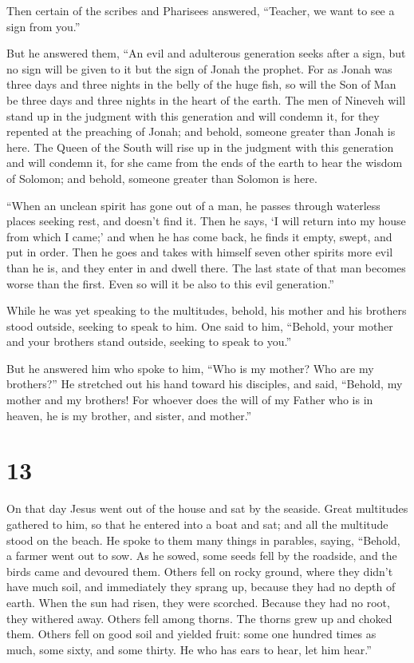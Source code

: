  Then certain of the scribes and Pharisees answered,
``Teacher, we want to see a sign from you.''

 But he answered them, ``An evil and adulterous generation
seeks after a sign, but no sign will be given to it but the sign of
Jonah the prophet.  For as Jonah was three days and three
nights in the belly of the huge fish, so will the Son of Man be three
days and three nights in the heart of the earth.  The men
of Nineveh will stand up in the judgment with this generation and will
condemn it, for they repented at the preaching of Jonah; and behold,
someone greater than Jonah is here.  The Queen of the South
will rise up in the judgment with this generation and will condemn it,
for she came from the ends of the earth to hear the wisdom of Solomon;
and behold, someone greater than Solomon is here.

 ``When an unclean spirit has gone out of a man, he passes
through waterless places seeking rest, and doesn't find it.
 Then he says, `I will return into my house from which I
came;' and when he has come back, he finds it empty, swept, and put in
order.  Then he goes and takes with himself seven other
spirits more evil than he is, and they enter in and dwell there. The
last state of that man becomes worse than the first. Even so will it be
also to this evil generation.''

 While he was yet speaking to the multitudes, behold, his
mother and his brothers stood outside, seeking to speak to him.
 One said to him, ``Behold, your mother and your brothers
stand outside, seeking to speak to you.''

 But he answered him who spoke to him, ``Who is my mother?
Who are my brothers?''  He stretched out his hand toward
his disciples, and said, ``Behold, my mother and my brothers!
 For whoever does the will of my Father who is in heaven,
he is my brother, and sister, and mother.''

\hypertarget{section-12}{%
\section{13}\label{section-12}}

 On that day Jesus went out of the house and sat by the
seaside.  Great multitudes gathered to him, so that he
entered into a boat and sat; and all the multitude stood on the beach.
 He spoke to them many things in parables, saying, ``Behold,
a farmer went out to sow.  As he sowed, some seeds fell by
the roadside, and the birds came and devoured them.  Others
fell on rocky ground, where they didn't have much soil, and immediately
they sprang up, because they had no depth of earth.  When
the sun had risen, they were scorched. Because they had no root, they
withered away.  Others fell among thorns. The thorns grew up
and choked them.  Others fell on good soil and yielded
fruit: some one hundred times as much, some sixty, and some thirty.
 He who has ears to hear, let him hear.''


